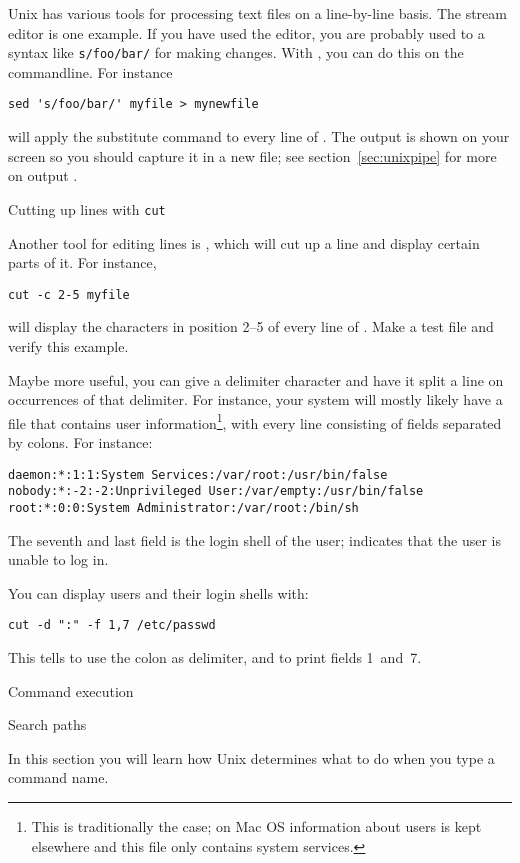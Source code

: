 Unix has various tools for processing text files on a line-by-line
basis. The stream editor  is one example. If you have used the
 editor, you are probably used to a syntax like
\verb+s/foo/bar/+ for making changes. With , you can do this on
the commandline. For instance
\begin{verbatim}
sed 's/foo/bar/' myfile > mynewfile
\end{verbatim}
will apply the substitute command  to every line of
. The output is shown on your screen so you should capture
it in a new file; see section~\ref{sec:unixpipe} for more on output
.

 {Cutting up lines with \protect\texttt{cut}}

Another tool for editing lines is , which will cut up a line
and display certain parts of it. For instance,
\begin{verbatim}
cut -c 2-5 myfile
\end{verbatim}
will display the characters in position 2--5 of every line of
. Make a test file and verify this example.

Maybe more useful, you can give  a delimiter character and have
it split a line on occurrences of that delimiter. For instance, your system
will mostly likely have a file  that contains user
information\footnote{This is traditionally the case; on Mac OS
  information about users is kept elsewhere and this file only
  contains system services.}, with every line consisting of fields
separated by colons. For instance:
\begin{verbatim}
daemon:*:1:1:System Services:/var/root:/usr/bin/false
nobody:*:-2:-2:Unprivileged User:/var/empty:/usr/bin/false
root:*:0:0:System Administrator:/var/root:/bin/sh
\end{verbatim}
The seventh and last field is the login shell of the user;
 indicates that the user is unable to log in.

You can display users and their login shells with:
\begin{verbatim}
cut -d ":" -f 1,7 /etc/passwd
\end{verbatim}
This tells  to use the colon as delimiter, and to print fields
1~and~7.

 {Command execution}

 {Search paths}
\begin{purpose}
  In this section you will learn how Unix determines what to do when
  you type a command name.
\end{purpose}

